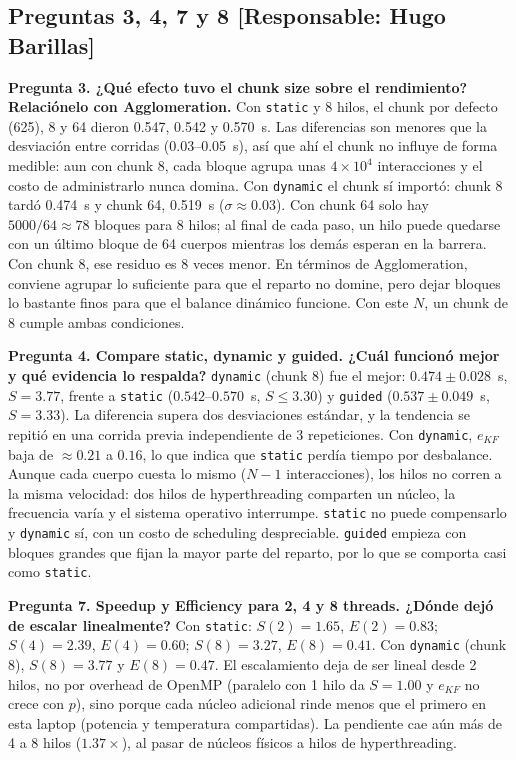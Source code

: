 \documentclass[11pt,a4paper]{article}
\begin{document}
\subsection*{Preguntas 3, 4, 7 y 8 [Responsable: Hugo Barillas]}
\textbf{Pregunta 3. ¿Qué efecto tuvo el chunk size sobre el rendimiento? Relaciónelo con Agglomeration.}
Con \texttt{static} y 8 hilos, el chunk por defecto (625), 8 y 64 dieron 0.547, 0.542 y 0.570~s. Las diferencias son menores que la desviación entre corridas (0.03--0.05~s), así que ahí el chunk no influye de forma medible: aun con chunk 8, cada bloque agrupa unas $4\times10^4$ interacciones y el costo de administrarlo nunca domina. Con \texttt{dynamic} el chunk sí importó: chunk 8 tardó 0.474~s y chunk 64, 0.519~s ($\sigma \approx 0.03$). Con chunk 64 solo hay $5000/64 \approx 78$ bloques para 8 hilos; al final de cada paso, un hilo puede quedarse con un último bloque de 64 cuerpos mientras los demás esperan en la barrera. Con chunk 8, ese residuo es 8 veces menor. En términos de Agglomeration, conviene agrupar lo suficiente para que el reparto no domine, pero dejar bloques lo bastante finos para que el balance dinámico funcione. Con este $N$, un chunk de 8 cumple ambas condiciones.

\textbf{Pregunta 4. Compare static, dynamic y guided. ¿Cuál funcionó mejor y qué evidencia lo respalda?}
\texttt{dynamic} (chunk 8) fue el mejor: $0.474 \pm 0.028$~s, $S = 3.77$, frente a \texttt{static} ($0.542$--$0.570$~s, $S \le 3.30$) y \texttt{guided} ($0.537 \pm 0.049$~s, $S = 3.33$). La diferencia supera dos desviaciones estándar, y la tendencia se repitió en una corrida previa independiente de 3 repeticiones. Con \texttt{dynamic}, $e_{KF}$ baja de $\approx 0.21$ a $0.16$, lo que indica que \texttt{static} perdía tiempo por desbalance. Aunque cada cuerpo cuesta lo mismo ($N-1$ interacciones), los hilos no corren a la misma velocidad: dos hilos de hyperthreading comparten un núcleo, la frecuencia varía y el sistema operativo interrumpe. \texttt{static} no puede compensarlo y \texttt{dynamic} sí, con un costo de scheduling despreciable. \texttt{guided} empieza con bloques grandes que fijan la mayor parte del reparto, por lo que se comporta casi como \texttt{static}.

\textbf{Pregunta 7. Speedup y Efficiency para 2, 4 y 8 threads. ¿Dónde dejó de escalar linealmente?}
Con \texttt{static}: $S(2)=1.65$, $E(2)=0.83$; $S(4)=2.39$, $E(4)=0.60$; $S(8)=3.27$, $E(8)=0.41$. Con \texttt{dynamic} (chunk 8), $S(8)=3.77$ y $E(8)=0.47$. El escalamiento deja de ser lineal desde 2 hilos, no por overhead de OpenMP (paralelo con 1 hilo da $S=1.00$ y $e_{KF}$ no crece con $p$), sino porque cada núcleo adicional rinde menos que el primero en esta laptop (potencia y temperatura compartidas). La pendiente cae aún más de 4 a 8 hilos ($1.37\times$), al pasar de núcleos físicos a hilos de hyperthreading.
\end{document}
